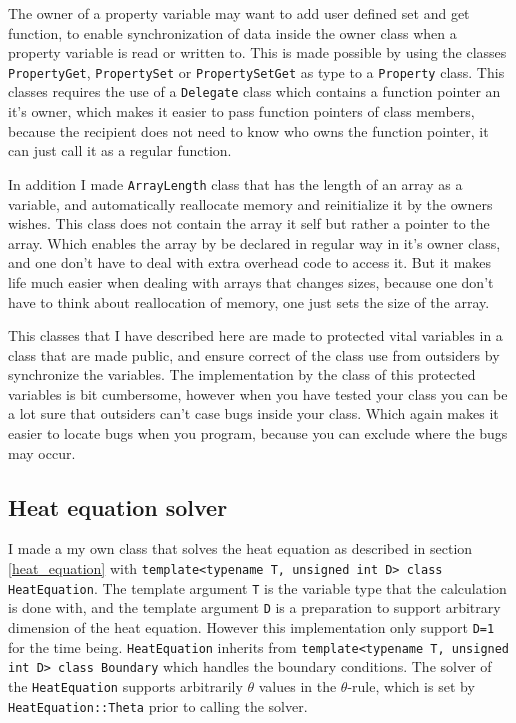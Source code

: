 \documentclass[11pt,english,a4paper]{article}
\begin{document}
\begin{flushleft}
The owner of a property variable may want to add user defined set and get function, to enable synchronization of data inside the owner class when a property variable is read or written to. This is made possible by using the classes \texttt{PropertyGet}, \texttt{PropertySet} or \texttt{PropertySetGet} as type to a \texttt{Property} class. This classes requires the use of a \texttt{Delegate} class which contains a function pointer an it's owner, which makes it easier to pass function pointers of class members, because the recipient does not need to know who owns the function pointer, it can just call it as a regular function. \linebreak

In addition I made \texttt{ArrayLength} class that has the length of an array as a variable, and automatically reallocate memory and reinitialize it by the owners wishes. This class does not contain the array it self but rather a pointer to the array. Which enables the array by be declared in regular way in it's owner class, and one don't have to deal with extra overhead code to access it. But it makes life much easier when dealing with arrays that changes sizes, because one don't have to think about reallocation of memory, one just sets the size of the array. \linebreak

This classes that I have described here are made to protected vital variables in a class that are made public, and ensure correct of the class use from outsiders by synchronize the variables. The implementation by the class of this protected variables is bit cumbersome, however when you have tested your class you can be a lot sure that outsiders can't case bugs inside your class. Which again makes it easier to locate bugs when you program, because you can exclude where the bugs may occur.

\subsection{Heat equation solver}

I made a my own class that solves the heat equation as described in section \ref{heat_equation} with  
\texttt{template<typename T, unsigned int D> class HeatEquation}. The template argument \texttt{T} is the variable type that the calculation is done with, and the template argument \texttt{D} is a preparation to support arbitrary dimension of the heat equation. However this implementation only support \texttt{D=1} for the time being. \texttt{HeatEquation} inherits from \texttt{template<typename T, unsigned int D> class Boundary} which handles the boundary conditions. The solver of the \texttt{HeatEquation} supports arbitrarily $\theta$ values in the $\theta$-rule, which is set by \texttt{HeatEquation::Theta} prior to calling the solver.


\end{flushleft}
\end{document}
